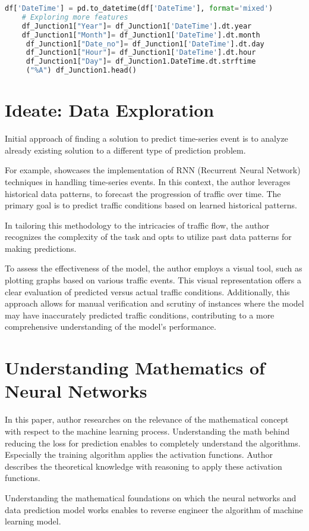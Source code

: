 \begin{lstlisting}[language=Python,caption={Data set fetching using Pandas},label={code:data}]
    df['DateTime'] = pd.to_datetime(df['DateTime'], format='mixed')
    # Exploring more features
    df_Junction1["Year"]= df_Junction1['DateTime'].dt.year 
    df_Junction1["Month"]= df_Junction1['DateTime'].dt.month
     df_Junction1["Date_no"]= df_Junction1['DateTime'].dt.day 
     df_Junction1["Hour"]= df_Junction1['DateTime'].dt.hour 
     df_Junction1["Day"]= df_Junction1.DateTime.dt.strftime
     ("%A") df_Junction1.head()
\end{lstlisting}




\section{Ideate: Data Exploration}

Initial approach of finding a solution to predict time-series event is to analyze already existing solution to a different type of prediction problem.

For example, \parencite[Section 4.3]{Goodfellow-et-al-2016} showcases the implementation of RNN (Recurrent Neural Network) techniques in handling time-series events. In this context, the author leverages historical data patterns, to forecast the progression of traffic over time. The primary goal is to predict traffic conditions based on learned historical patterns.

In tailoring this methodology to the intricacies of traffic flow, the author recognizes the complexity of the task and opts to utilize past data patterns for making predictions.

To assess the effectiveness of the model, the author employs a visual tool, such as plotting graphs based on various traffic events. This visual representation offers a clear evaluation of predicted versus actual traffic conditions. Additionally, this approach allows for manual verification and scrutiny of instances where the model may have inaccurately predicted traffic conditions, contributing to a more comprehensive understanding of the model's performance.


\section{Understanding Mathematics of Neural Networks}

In this paper, author researches on the relevance of the mathematical concept with respect to the machine learning process. Understanding the math behind reducing the loss for prediction enables to completely understand the algorithms. Especially the training algorithm applies the activation functions. Author describes the theoretical knowledge with reasoning to apply these activation functions.

Understanding the mathematical foundations on which the neural networks and data prediction model works enables to reverse engineer the algorithm of machine learning model.



